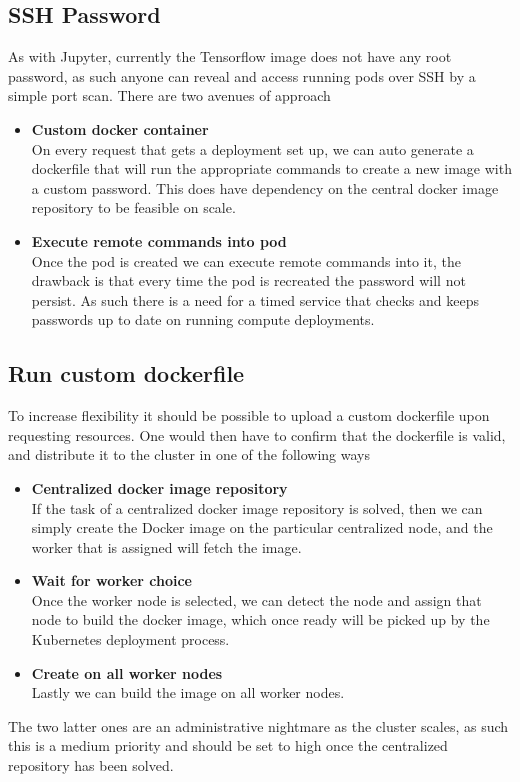 \documentclass[../main.tex]{subfiles}
\begin{document}
\subsection*{SSH Password}
As with Jupyter, currently the Tensorflow image does not have any root password, as such anyone can reveal and access running pods over SSH by a simple port scan. There are two avenues of approach
\begin{itemize}
    \item\textbf{Custom docker container}\\
            On every request that gets a deployment set up, we can auto generate a dockerfile that will run the appropriate commands to create a new image with a custom password. This does have dependency on the central docker image repository to be feasible on scale.
    \item\textbf{Execute remote commands into pod}\\
            Once the pod is created we can execute remote commands into it, the drawback is that every time the pod is recreated the password will not persist. As such there is a need for a timed service that checks and keeps passwords up to date on running compute deployments.
\end{itemize}

\subsection*{Run custom dockerfile}
To increase flexibility it should be possible to upload a custom dockerfile upon requesting resources. One would then have to confirm that the dockerfile is valid, and distribute it to the cluster in one of the following ways
\begin{itemize}
    \item\textbf{Centralized docker image repository}\\
            If the task of a centralized docker image repository is solved, then we can simply create the Docker image on the particular centralized node, and the worker that is assigned will fetch the image.
    \item\textbf{Wait for worker choice}\\
            Once the worker node is selected, we can detect the node and assign that node to build the docker image, which once ready will be picked up by the Kubernetes deployment process.
    \item\textbf{Create on all worker nodes}\\
            Lastly we can build the image on all worker nodes.
\end{itemize}
The two latter ones are an administrative nightmare as the cluster scales, as such this is a medium priority and should be set to high once the centralized repository has been solved.
\end{document}

